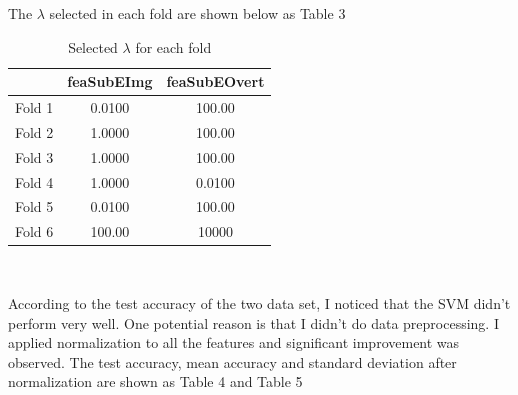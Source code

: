 \documentclass{article}
\begin{document}
\begin{table}[htbp] 
\end{table}

The $\lambda$ selected in each fold are shown below as Table 3

\begin{table}[htbp]
	\centering
	\begin{tabular}{|c|c|c|} \hline
		& feaSubEImg & feaSubEOvert\\ \hline 
		Fold 1   &  0.0100  & 100.00  \\ \hline
		Fold 2   &  1.0000  & 100.00  \\ \hline
		Fold 3   &  1.0000  & 100.00  \\ \hline
		Fold 4   &  1.0000  & 0.0100  \\ \hline
		Fold 5   &  0.0100  & 100.00  \\ \hline
		Fold 6   &  100.00  & 10000  \\ \hline
	\end{tabular}
	\caption{Selected $\lambda$ for each fold}
\end{table}\

According to the test accuracy of the two data set, I noticed that the SVM didn't perform very well. One potential reason is that I didn't do data preprocessing. I applied normalization to all the features and significant improvement was observed. The test accuracy, mean accuracy and standard deviation after normalization are shown as Table 4 and Table 5
\end{document}
